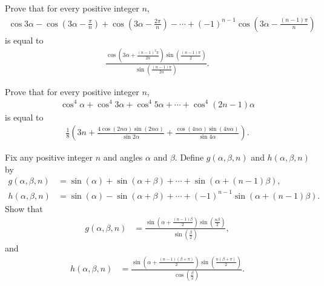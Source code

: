 \begin{question}
Prove that for every positive integer $n$,
    \begin{align*}
        \cos 3\alpha - \cos\left(3\alpha-\frac{\pi}{n}\right) + \cos\left(3\alpha-\frac{2\pi}{n}\right) - \cdots + (-1)^{n-1} \cos\left(3\alpha-\frac{(n-1)\pi}{n}\right)
    \end{align*}
is equal to
    \begin{align*}
        \frac{\displaystyle \cos\left(3\alpha+\frac{(n-1)^2\pi}{2n}\right)\sin\left(\frac{(n-1)\pi}{2}\right)}{\displaystyle \sin\left(\frac{(n-1)\pi}{2n}\right)}.
    \end{align*}
\end{question}



\begin{question}
Prove that for every positive integer $n$,
    \begin{align*}
        \cos^4 \alpha + \cos^4 3\alpha + \cos^4 5\alpha + \cdots + \cos^4(2n-1)\alpha
    \end{align*}
is equal to
    \begin{align*}
        \frac{1}{8}\left(3n+\frac{4\cos(2n\alpha)\sin(2n\alpha)}{\sin 2\alpha} + \frac{\cos(4n\alpha)\sin(4n\alpha)}{\sin 4\alpha} \right).
    \end{align*}
\end{question}



\begin{tcolorbox}[title={(Alternating) Sum of Sine of Angles in an AP}]
    \begin{question}[name=Sum of Sines of Angles in an AP]
        Fix any positive integer $n$ and angles $\alpha$ and $\beta$. Define $g(\alpha, \beta, n)$ and $h(\alpha,\beta,n)$ by
        \begin{align*}
            g(\alpha,\beta,n) &= \sin(\alpha) + \sin(\alpha+\beta) + \cdots + \sin(\alpha+(n-1)\beta),\\
            h(\alpha,\beta,n) &= \sin(\alpha) - \sin(\alpha+\beta) + \cdots + (-1)^{n-1}\sin(\alpha+(n-1)\beta).
        \end{align*}
        Show that
        \begin{align*}
             g(\alpha,\beta,n) &= \frac{\displaystyle\sin\left(\alpha+\frac{(n-1)\beta}{2}\right)\sin\left(\frac{n\beta}{2}\right)}{\displaystyle\sin\left(\frac{\beta}{2}\right)},
        \end{align*}
        and
        \begin{align*}
             h(\alpha,\beta,n) &= \frac{\displaystyle\sin\left(\alpha+\frac{(n-1)(\beta+\pi)}{2}\right)\sin\left(\frac{n(\beta+\pi)}{2}\right)}{\displaystyle\cos\left(\frac{\beta}{2}\right)}.            
        \end{align*}
    \end{question}
\end{tcolorbox}

